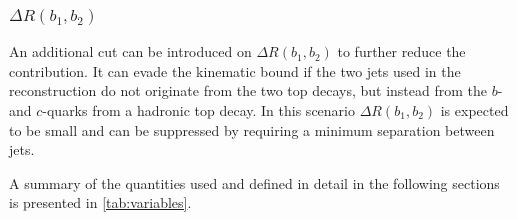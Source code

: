 \subsubsection{ \( \Delta R (b_{1}, b_{2}) \) }
An additional cut can be introduced on \( \Delta R (b_{1}, b_{2}) \)
to further reduce the \ttbar contribution. It can evade the \mblmin kinematic
bound if the two \btagged jets used in the reconstruction do not originate
from the two top decays, but instead from the \(b\)- and \(c\)-quarks from
a hadronic top decay. In this scenario \( \Delta R (b_{1}, b_{2}) \)
is expected to be small and can be suppressed by requiring
a minimum separation between \btagged jets.

A summary of the quantities used and defined in detail in the following sections is presented in \cref{tab:variables}.

